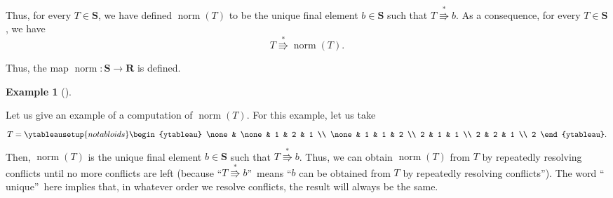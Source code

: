 \documentclass[numbers=enddot,12pt,final,onecolumn,notitlepage]{scrartcl}%
\theoremstyle{definition}
\newtheorem{exmp}[theo]{Example}
\newenvironment{example}[1][]
{\begin{exmp}[#1]\begin{leftbar}}
{\end{leftbar}\end{exmp}}
\begin{document}
Thus, for every $T\in\mathbf{S}$, we have defined $\operatorname*{norm}\left(
T\right)  $ to be the unique final element $b\in\mathbf{S}$ such that
$T\overset{\ast}{\Rrightarrow}b$. As a consequence, for every $T\in\mathbf{S}%
$, we have
\begin{equation}
T\overset{\ast}{\Rrightarrow}\operatorname*{norm}\left(  T\right)  .
\label{pf.lem.BK.norm.=>}%
\end{equation}


Thus, the map $\operatorname*{norm}:\mathbf{S}\rightarrow\mathbf{R}$ is defined.

\begin{example}
Let us give an example of a computation of $\operatorname*{norm}\left(
T\right)  $. For this example, let us take%
\[
T=%
\ytableausetup{notabloids}
\begin{ytableau}
\none& \none& 1 & 2 & 1 \\
\none& 1 & 1 & 2 \\
2 & 1 & 1 \\
2 & 2 & 1 \\
2
\end{ytableau}%
.
\]
Then, $\operatorname*{norm}\left(  T\right)  $ is the unique final element
$b\in\mathbf{S}$ such that $T\overset{\ast}{\Rrightarrow}b$. Thus, we can
obtain $\operatorname*{norm}\left(  T\right)  $ from $T$ by repeatedly
resolving conflicts until no more conflicts are left (because
\textquotedblleft$T\overset{\ast}{\Rrightarrow}b$\textquotedblright\ means
\textquotedblleft$b$ can be obtained from $T$ by repeatedly resolving
conflicts\textquotedblright). The word \textquotedblleft
unique\textquotedblright\ here implies that, in whatever order we resolve
conflicts, the result will always be the same.


\end{example}
\end{document}
